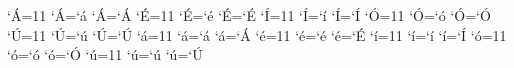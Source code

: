 %
% 
% 
%
%  
\catcode`^^c1=11 \lccode`^^c1=`^^e1 \uccode`^^c1=`^^c1    %
\catcode`^^c9=11 \lccode`^^c9=`^^e9 \uccode`^^c9=`^^c9    %
\catcode`^^cd=11 \lccode`^^cd=`^^ed \uccode`^^cd=`^^cd    %
\catcode`^^d3=11 \lccode`^^d3=`^^f3 \uccode`^^d3=`^^d3    %
\catcode`^^da=11 \lccode`^^da=`^^fa \uccode`^^da=`^^da    %
\catcode`^^e1=11 \lccode`^^e1=`^^e1 \uccode`^^e1=`^^c1    %
\catcode`^^e9=11 \lccode`^^e9=`^^e9 \uccode`^^e9=`^^c9    %
\catcode`^^ed=11 \lccode`^^ed=`^^ed \uccode`^^ed=`^^cd    %
\catcode`^^f3=11 \lccode`^^f3=`^^f3 \uccode`^^f3=`^^d3    %
\catcode`^^fa=11 \lccode`^^fa=`^^fa \uccode`^^fa=`^^da    %

